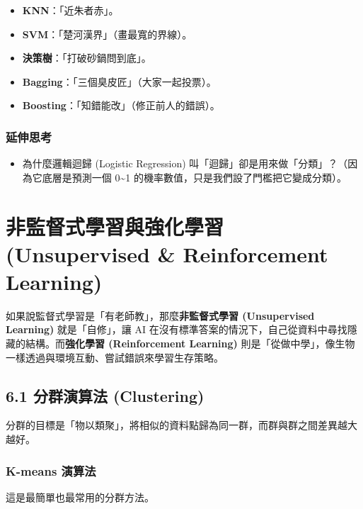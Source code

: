 \documentclass[
  letterpaper,
  DIV=11,
  numbers=noendperiod]{scrreprt}
\providecommand{\tightlist}{%
  \setlength{\itemsep}{0pt}\setlength{\parskip}{0pt}}
\begin{document}
\begin{itemize}
\tightlist
\item
  \textbf{KNN}：「近朱者赤」。
\item
  \textbf{SVM}：「楚河漢界」（畫最寬的界線）。
\item
  \textbf{決策樹}：「打破砂鍋問到底」。
\item
  \textbf{Bagging}：「三個臭皮匠」（大家一起投票）。
\item
  \textbf{Boosting}：「知錯能改」（修正前人的錯誤）。
\end{itemize}

\section{延伸思考}\label{ux5ef6ux4f38ux601dux8003-4}

\begin{itemize}
\tightlist
\item
  為什麼邏輯迴歸 (Logistic Regression)
  叫「迴歸」卻是用來做「分類」？（因為它底層是預測一個 0\textasciitilde1
  的機率數值，只是我們設了門檻把它變成分類）。
\end{itemize}

\part{非監督式學習與強化學習 (Unsupervised \& Reinforcement
Learning)}\label{ux975eux76e3ux7763ux5f0fux5b78ux7fd2ux8207ux5f37ux5316ux5b78ux7fd2-unsupervised-reinforcement-learning}

如果說監督式學習是「有老師教」，那麼\textbf{非監督式學習 (Unsupervised
Learning)} 就是「自修」，讓 AI
在沒有標準答案的情況下，自己從資料中尋找隱藏的結構。而\textbf{強化學習
(Reinforcement Learning)}
則是「從做中學」，像生物一樣透過與環境互動、嘗試錯誤來學習生存策略。

\chapter{6.1 分群演算法 (Clustering)}\label{sec-clustering}

分群的目標是「物以類聚」，將相似的資料點歸為同一群，而群與群之間差異越大越好。

\section{K-means 演算法}\label{sec-kmeans}

這是最簡單也最常用的分群方法。
\end{document}
